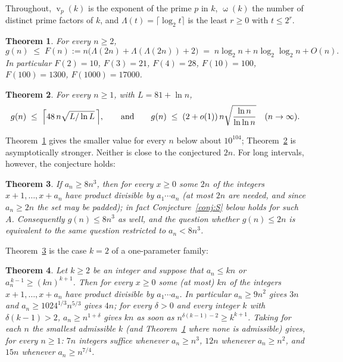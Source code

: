 \documentclass[11pt]{article}
\newtheorem{theorem}{Theorem}[section]
\theoremstyle{definition}
\newcommand{\Lam}{\Lambda}
\DeclareMathOperator{\vp}{v}
\DeclareMathOperator{\om}{\omega}
\begin{document}
Throughout, $\vp_p(k)$ is the exponent of the prime $p$ in $k$, $\om(k)$ the number of distinct prime factors
of $k$, and $\Lam(t)=\lceil\log_2 t\rceil$ is the least $r\ge 0$ with $t\le 2^r$.

\begin{theorem}\label{thm:log}
For every $n\ge 2$,
\[
 g(n)\;\le\;F(n):=n\bigl(\Lam(2n)+\Lam(\Lam(2n))+2\bigr)\;=\;n\log_2 n+n\log_2\log_2 n+O(n).
\]
In particular $F(2)=10$, $F(3)=21$, $F(4)=28$, $F(10)=100$, $F(100)=1300$, $F(1000)=17000$.
\end{theorem}

\begin{theorem}\label{thm:sqrt}
For every $n\ge 1$, with $L=81+\ln n$,
\[
 g(n)\;\le\;\Bigl\lceil 48\,n\sqrt{L/\ln L}\,\Bigr\rceil ,
\qquad\text{and}\qquad
 g(n)\;\le\;(2+o(1))\,n\sqrt{\frac{\ln n}{\ln\ln n}}\quad(n\to\infty).
\]
\end{theorem}

Theorem~\ref{thm:log} gives the smaller value for every $n$ below about $10^{104}$; Theorem~\ref{thm:sqrt}
is asymptotically stronger. Neither is close to the conjectured $2n$. For long intervals, however, the
conjecture holds:

\begin{theorem}\label{thm:long}
If $a_n\ge 8n^3$, then for every $x\ge 0$ some $2n$ of the integers $x+1,\dots,x+a_n$ have product divisible
by $a_1\cdots a_n$ (at most $2n$ are needed, and since $a_n\ge 2n$ the set may be padded); in fact
Conjecture~\ref{conj:S} below holds for such $A$. Consequently $g(n)\le 8n^3$ as
well, and the question whether $g(n)\le 2n$ is equivalent to the same question restricted to $a_n<8n^3$.
\end{theorem}

Theorem~\ref{thm:long} is the case $k=2$ of a one-parameter family:

\begin{theorem}\label{thm:ksplit}
Let $k\ge 2$ be an integer and suppose that $a_n\le kn$ or $a_n^{\,k-1}\ge(kn)^{k+1}$. Then for every $x\ge 0$ some (at
most) $kn$ of the integers $x+1,\dots,x+a_n$ have product divisible by $a_1\cdots a_n$. In particular $a_n\ge 9n^2$
gives $3n$ and $a_n\ge 1024^{1/3}n^{5/3}$ gives $4n$; for every $\delta>0$ and every integer $k$ with
$\delta(k-1)>2$, $a_n\ge n^{1+\delta}$ gives $kn$ as soon as $n^{\delta(k-1)-2}\ge k^{k+1}$. Taking for each $n$ the
smallest admissible $k$ (and Theorem~\ref{thm:log} where none is admissible) gives, for every $n\ge 1$: $7n$ integers
suffice whenever $a_n\ge n^3$, $12n$ whenever $a_n\ge n^2$, and $15n$ whenever $a_n\ge n^{7/4}$.
\end{theorem}
\end{document}
